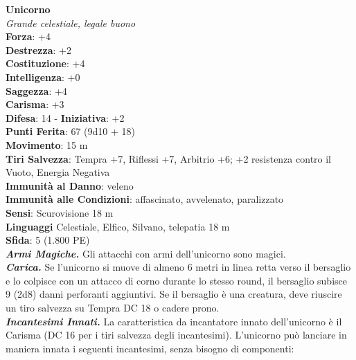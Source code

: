 \begin{multicols}{2}
\medskip\textbf{Unicorno}\\
\emph{Grande celestiale, legale buono}\\
\textbf{Forza}: +4\\
\textbf{Destrezza}: +2\\
\textbf{Costituzione}: +4\\
\textbf{Intelligenza}: +0\\
\textbf{Saggezza}: +4\\
\textbf{Carisma}: +3\\
\textbf{Difesa}: 14 - \textbf{Iniziativa}: +2\\
\textbf{Punti Ferita}: 67 (9d10 + 18)\\
\textbf{Movimento}: 15 m\\
\textbf{Tiri Salvezza}: Tempra +7, Riflessi +7, Arbitrio +6; +2 resistenza contro il Vuoto, Energia Negativa\\
\textbf{Immunità al Danno}: veleno\\
\textbf{Immunità alle Condizioni}: affascinato, avvelenato, paralizzato\\
\textbf{Sensi}: Scurovisione 18 m\\
\textbf{Linguaggi} Celestiale, Elfico, Silvano, telepatia 18 m\\
\textbf{Sfida}: 5 (1.800 PE)\smallskip\\
\emph{\textbf{Armi Magiche.}} Gli attacchi con armi dell'unicorno sono magici.\\
\emph{\textbf{Carica.}} Se l'unicorno si muove di almeno 6 metri in linea retta verso il bersaglio e lo colpisce con un attacco di corno durante lo stesso round, il bersaglio subisce 9 (2d8) danni perforanti aggiuntivi. Se il bersaglio è una creatura, deve riuscire un tiro salvezza su Tempra DC  18 o cadere prono.\\

\emph{\textbf{Incantesimi Innati.}} La caratteristica da incantatore innato dell'unicorno è il Carisma (DC  16 per i tiri salvezza degli incantesimi). L'unicorno può lanciare in maniera innata i seguenti incantesimi, senza bisogno di componenti:\\


\end{multicols}
